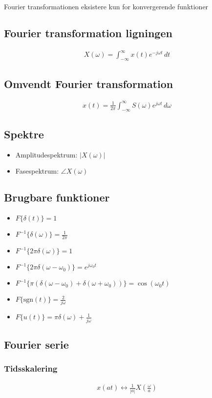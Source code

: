 Fourier transformationen eksistere kun for konvergerende funktioner
\subsection{Fourier transformation ligningen}
	\begin{align}
		X(\omega)=\int_{-\infty}^{\infty}x(t)e^{-j\omega t}\,dt
	\end{align}

\subsection{Omvendt Fourier transformation}
	\begin{align}
		x(t)=\frac{1}{2\pi}\int_{-\infty}^{\infty}S(\omega)e^{j\omega t}\,d\omega
	\end{align}

\subsection{Spektre}
	\begin{itemize}
		\item Amplitudespektrum: $|X(\omega)|$
		\item Fasespektrum: $\angle X(\omega)$
	\end{itemize}

\subsection{Brugbare funktioner}
	\begin{itemize}
		\item $F\{\delta(t)\}=1$
		\item $F^{-1}\{\delta(\omega)\}=\frac{1}{2\pi}$
		\item $F^{-1}\{2\pi\delta(\omega)\}=1$
		\item $F^{-1}\{2\pi\delta(\omega-\omega_0)\}=e^{j\omega_0t}$
		\item $F^{-1}\{\pi(\delta(\omega-\omega_0)+\delta(\omega+\omega_0))\}=\cos(\omega_0t)$
		\item $F\{\text{sgn}(t)\}=\frac{2}{j\omega}$
		\item $F\{u(t)\}=\pi\delta(\omega)+\frac{1}{j\omega}$
	\end{itemize}

\subsection{Fourier serie}
	\subsubsection{Tidsskalering}
		\begin{align}
			x(at)\leftrightarrow\frac{1}{|a|}X(\frac{\omega}{a})
		\end{align}

